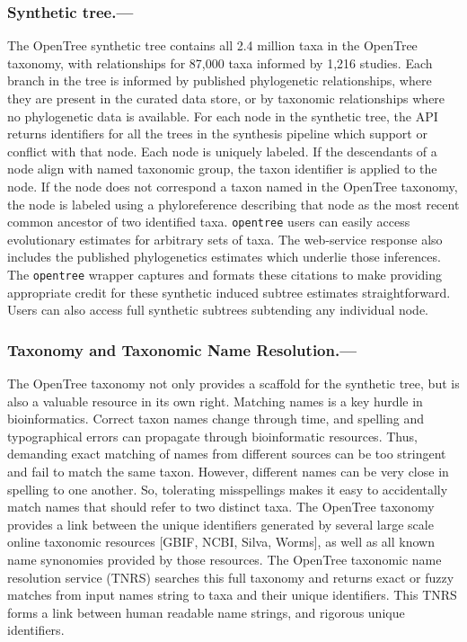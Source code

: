\documentclass[oupdraft]{sysbio_sse}
\begin{document}
\subsubsection{Synthetic tree.---} The OpenTree synthetic tree contains all 2.4 million taxa in the OpenTree taxonomy, with relationships for 87,000 taxa informed by 1,216 studies.
Each branch in the tree is informed by published phylogenetic relationships, where they are present in the curated data store, or by taxonomic relationships where no phylogenetic data is available.
For each node in the synthetic tree, the API returns identifiers for
all the trees in the synthesis pipeline which support or conflict with that node.
Each node is uniquely labeled.
If the descendants of a node align with named taxonomic group, the taxon identifier is applied to the node.
If the node does not correspond a taxon named in the OpenTree taxonomy, the node is labeled using a phyloreference \citep{parr_evolutionary_2012} describing that node as the most recent common ancestor of two identified taxa.
\texttt{opentree} users can easily access evolutionary estimates for arbitrary sets of taxa.
The web-service response also includes the published phylogenetics estimates which underlie those inferences.
The \texttt{opentree} wrapper captures and formats these citations to make providing appropriate credit for these synthetic induced subtree estimates straightforward.
Users can also access full synthetic subtrees subtending any individual node.


\subsubsection{Taxonomy and Taxonomic Name Resolution.---} The OpenTree taxonomy not only provides a scaffold for the synthetic tree, but is also a valuable resource in its own right.
Matching names is a key hurdle in bioinformatics.
Correct taxon names change through time, and spelling and typographical errors can propagate through bioinformatic resources.
Thus, demanding exact matching of names from different sources can be too stringent and fail to match the same taxon.
However, different names can be very close in spelling to one another.
So, tolerating misspellings makes it easy to accidentally match names that should refer to two distinct taxa.
The OpenTree taxonomy \citep{rees_automated_2017, opentreeoflife_open_2019-1} provides a link between the unique identifiers generated by several large scale online taxonomic resources [GBIF, NCBI, Silva, Worms], as well as all known name synonomies provided by those resources.
The OpenTree taxonomic name resolution service (TNRS) searches this full taxonomy and returns exact or fuzzy matches from input names string to taxa and their unique identifiers.
This TNRS forms a link between human readable name strings, and rigorous unique identifiers.
\end{document}
